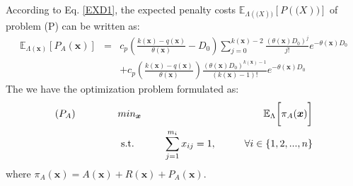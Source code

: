 \documentclass[preprint,12pt]{elsarticle}
\begin{document}
\begin{description}
According to Eq. \eqref{EXD1}, the expected penalty costs $\mathbb{E}_{\Lambda(\boldsymbol(X))}[P(\boldsymbol(X))]$ of problem (P) can be written as:
\begin{eqnarray}
\mathbb{E}_{\Lambda(\boldsymbol{x})}[P_{A}(\boldsymbol{x})]&=&c_{p}(\frac{k(\boldsymbol{x})-q(\boldsymbol{x})}{\theta(\boldsymbol{x})}-D_{0})\sum_{j=0}^{k(\boldsymbol{x})-2}{\frac{(\theta(\boldsymbol{x}) D_{0})^j}{j!}e^{-\theta(\boldsymbol{x}) D_{0}}}\nonumber\\
&&+c_{p}(\frac{k(\boldsymbol{x})-q(\boldsymbol{x})}{\theta(\boldsymbol{x})})\frac{(\theta(\boldsymbol{x})D_{0})^{k(\boldsymbol{x})-1}}{(k(\boldsymbol{x})-1)!}e^{-\theta(\boldsymbol{x})D_{0}}
\end{eqnarray}
The we have the optimization problem formulated as:
\begin{eqnarray}
\text{($P_{A}$)} \hspace{15mm} & min_{\boldsymbol{x}} & \hspace{10mm} \mathbb{E}_{\Lambda} \bigg[ \pi_{A}(\boldsymbol{x})\bigg] \nonumber\\
& \text{ s.t. }&  \hspace{5mm} \sum_{j=1}^{m_i}{x_{ij}}=1, \hspace{10mm} \forall i \in \{1,2,...,n\} \nonumber
\end{eqnarray}
where $\pi_{A}(\boldsymbol{x})=A(\boldsymbol{x})+R(\boldsymbol{x})+P_{A}(\boldsymbol{x})$.

\end{description}



\end{document}
